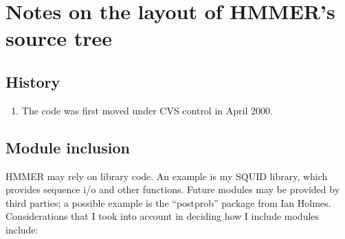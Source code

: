 \section{Notes on the layout of HMMER's source tree}

\subsection{History}

\begin{enumerate}
\item The code was first moved under CVS control in April 2000.
\end{enumerate}

\subsection{Module inclusion}

HMMER may rely on library code. An example is my SQUID library, which
provides sequence i/o and other functions. Future modules may be
provided by third parties; a possible example is the ``postprob''
package from Ian Holmes. Considerations that I took into account in
deciding how I include modules include:

